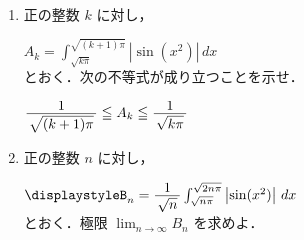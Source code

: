 ﻿\documentclass[../../../uem_mat_tok_q.tex]{subfiles}
\begin{document}
    \begin{enumerate}
        \item 正の整数 $k$ に対し，

            \myspaceb%
            $\displaystyle%
                A_k = \int_{\sqrt{k\pi}}^{\sqrt{(k+1)\pi}}\left|\sin(x^2)\right| \, dx%
            $\\
            とおく．次の不等式が成り立つことを示せ．
            
            \myspaceb%
            $\displaystyle%
                \myfraca{1}{\sqrt{(k+1)\pi}}\leqq A_k\leqq \myfraca{1}{\sqrt{k\pi}}%
            $
        \item 正の整数 $n$ に対し，

            \myspaceb%
            $\displaystyle%
                B_n = \myfraca{1}{\sqrt{n}}\int_{\sqrt{n\pi}}^{\sqrt{2n\pi}}%
                    \left|\sin(x^2)\right| \, dx%
            $\\
            とおく．極限 $\displaystyle\lim_{n\to\infty}B_n$ を求めよ．
    \end{enumerate}
\end{document}
